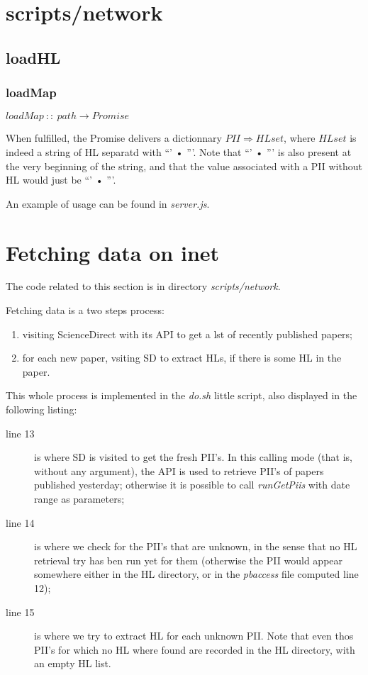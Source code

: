\documentclass[a4paper,11pt]{report}
\begin{document}
\section{scripts/network}
\subsection{loadHL}
\subsubsection{loadMap}
$
loadMap\ ::\ path\rightarrow Promise 
$

When fulfilled, the Promise delivers a dictionnary $PII\Rightarrow HLset$, where $HLset$ is indeed a string of HL separatd with ``' • '''. Note that ``' • ''' is also present at the very beginning of the string, and that the value associated with a PII without HL would just be ``' • '''.

An example of usage can be found in \emph{server.js}.

\section{Fetching data on inet}\label{fetchinginet}
The code related to this section is in directory \emph{scripts/network}.

Fetching data is a two steps process:
\begin{enumerate}
\item visiting ScienceDirect with its API to get a lst of recently published papers;
\item for each new paper, vsiting SD to extract HLs, if there is some HL in the paper.
\end{enumerate}


This whole process is implemented in the \emph{do.sh} little script, also displayed in the following listing:


\begin{description}
\item[line 13] is where SD is visited to get the fresh PII's. In this calling mode (that is, without any argument), the API is used to retrieve PII's of papers published yesterday; otherwise it is possible to call \emph{runGetPiis} with date range as parameters;
\item[line 14] is where we check for the PII's that are unknown, in the sense that no HL retrieval try has ben run yet for them (otherwise the PII would appear somewhere either in the HL directory, or in the \emph{pbaccess} file computed line 12);
\item[line 15] is where we try to extract HL for each unknown PII. Note that even thos PII's for which no HL where found are recorded in the HL directory, with an empty HL list.
\end{description}
\end{document}
